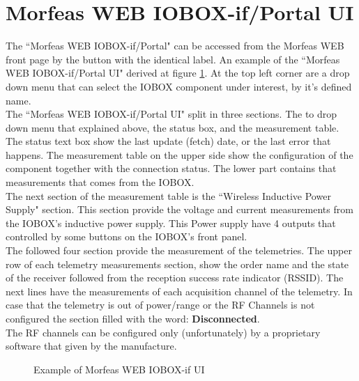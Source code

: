 \section{Morfeas WEB IOBOX-if/Portal UI}

The ``Morfeas WEB IOBOX-if/Portal" can be accessed from the Morfeas WEB front page by the button with the identical label.
An example of the ``Morfeas WEB IOBOX-if/Portal UI" derived at figure \ref{fig:IOBOX-if_UI}.
At the top left corner are a drop down menu that can select the IOBOX component under interest, by it's defined name.\\

\noindent The ``Morfeas WEB IOBOX-if/Portal UI" split in three sections.
The to drop down menu that explained above, the status box, and the measurement table.
The status text box show the last update (fetch) date, or the last error that happens.
The measurement table on the upper side show the configuration of the component together with the connection status.
The lower part contains that measurements that comes from the IOBOX.\\

\noindent The next section of the measurement table is the ``Wireless Inductive Power Supply" section.
This section provide the voltage and current measurements from the IOBOX's inductive power supply.
This Power supply have 4 outputs that controlled by some buttons on the IOBOX's front panel.\\

\noindent The followed four section provide the measurement of the telemetries.
The upper row of each telemetry measurements section, show the order name and the state of the receiver followed from the reception success rate indicator (RSSID).
The next lines have the measurements of each acquisition channel of the telemetry.
In case that the telemetry is out of power/range or the RF Channels is not configured the section filled with the word: \textbf{Disconnected}.\\

\noindent The RF channels can be configured only (unfortunately) by a proprietary software that given by the manufacture.

\begin{figure}[h]
\centering
	\caption{Example of Morfeas WEB IOBOX-if UI}
	\label{fig:IOBOX-if_UI}
\end{figure}